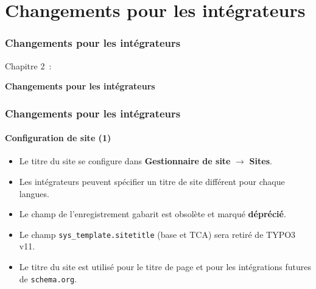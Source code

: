 %

\section{Changements pour les intégrateurs}
\begin{frame}[fragile]
	\frametitle{Changements pour les intégrateurs}

	\begin{center}\huge{Chapitre 2~:}\end{center}
	\begin{center}\huge{\color{typo3darkgrey}\textbf{Changements pour les intégrateurs}}\end{center}

\end{frame}


\begin{frame}[fragile]
	\frametitle{Changements pour les intégrateurs}
	\framesubtitle{Configuration de site (1)}

	\begin{itemize}

		\item Le titre du site se configure dans
			\textbf{Gestionnaire de site} $\rightarrow$ \textbf{Sites}.
		\item Les intégrateurs peuvent spécifier un titre de site différent pour chaque langues.
		\item Le champ de l'enregistrement gabarit est obsolète et marqué \textbf{déprécié}.
		\item Le champ \texttt{sys\_template.sitetitle} (base et TCA) sera retiré de TYPO3 v11.
		\item Le titre du site est utilisé pour le titre de page et pour les intégrations futures de
			\texttt{schema.org}.
	\end{itemize}

\end{frame}


